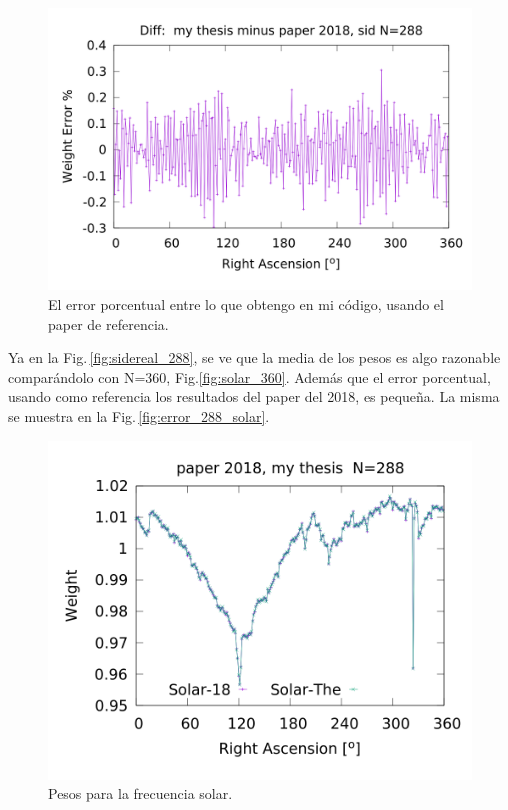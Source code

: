 	\begin{figure}[H]
	\centering
	\includegraphics[width=0.8\linewidth]{Graficos/sidereal_my_and_paper_in_288_error.png}
	\caption{El error porcentual entre lo que obtengo en mi código, usando el paper de referencia.}
	\label{fig:error_288_sidereal}
	\end{figure}


	Ya en la Fig.\,\ref{fig:sidereal_288}, se ve que la media de los pesos es algo razonable comparándolo con N=360, Fig.\ref{fig:solar_360}. Además que el error porcentual, usando como referencia los resultados del paper del 2018, es pequeña. La misma se muestra en la Fig.\,\ref{fig:error_288_solar}.

	\begin{figure}[H]
	\centering
	\includegraphics[width=0.8\linewidth]{Graficos/solar_my_and_paper_2018_in_288.png}
	\caption{Pesos para la frecuencia solar.}
	\label{fig:solar_288}
	\end{figure}


